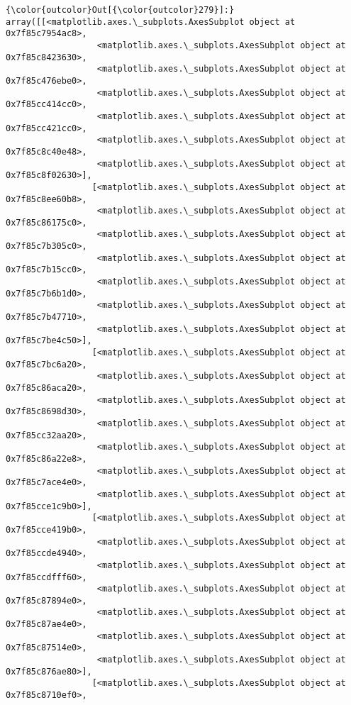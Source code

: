 \documentclass[11pt]{article}
\begin{document}
\begin{Verbatim}[commandchars=\\\{\}]
{\color{outcolor}Out[{\color{outcolor}279}]:} array([[<matplotlib.axes.\_subplots.AxesSubplot object at 0x7f85c7954ac8>,
                  <matplotlib.axes.\_subplots.AxesSubplot object at 0x7f85c8423630>,
                  <matplotlib.axes.\_subplots.AxesSubplot object at 0x7f85c476ebe0>,
                  <matplotlib.axes.\_subplots.AxesSubplot object at 0x7f85cc414cc0>,
                  <matplotlib.axes.\_subplots.AxesSubplot object at 0x7f85cc421cc0>,
                  <matplotlib.axes.\_subplots.AxesSubplot object at 0x7f85c8c40e48>,
                  <matplotlib.axes.\_subplots.AxesSubplot object at 0x7f85c8f02630>],
                 [<matplotlib.axes.\_subplots.AxesSubplot object at 0x7f85c8ee60b8>,
                  <matplotlib.axes.\_subplots.AxesSubplot object at 0x7f85c86175c0>,
                  <matplotlib.axes.\_subplots.AxesSubplot object at 0x7f85c7b305c0>,
                  <matplotlib.axes.\_subplots.AxesSubplot object at 0x7f85c7b15cc0>,
                  <matplotlib.axes.\_subplots.AxesSubplot object at 0x7f85c7b6b1d0>,
                  <matplotlib.axes.\_subplots.AxesSubplot object at 0x7f85c7b47710>,
                  <matplotlib.axes.\_subplots.AxesSubplot object at 0x7f85c7be4c50>],
                 [<matplotlib.axes.\_subplots.AxesSubplot object at 0x7f85c7bc6a20>,
                  <matplotlib.axes.\_subplots.AxesSubplot object at 0x7f85c86aca20>,
                  <matplotlib.axes.\_subplots.AxesSubplot object at 0x7f85c8698d30>,
                  <matplotlib.axes.\_subplots.AxesSubplot object at 0x7f85cc32aa20>,
                  <matplotlib.axes.\_subplots.AxesSubplot object at 0x7f85c86a22e8>,
                  <matplotlib.axes.\_subplots.AxesSubplot object at 0x7f85c7ace4e0>,
                  <matplotlib.axes.\_subplots.AxesSubplot object at 0x7f85cce1c9b0>],
                 [<matplotlib.axes.\_subplots.AxesSubplot object at 0x7f85cce419b0>,
                  <matplotlib.axes.\_subplots.AxesSubplot object at 0x7f85ccde4940>,
                  <matplotlib.axes.\_subplots.AxesSubplot object at 0x7f85ccdfff60>,
                  <matplotlib.axes.\_subplots.AxesSubplot object at 0x7f85c87894e0>,
                  <matplotlib.axes.\_subplots.AxesSubplot object at 0x7f85c87ae4e0>,
                  <matplotlib.axes.\_subplots.AxesSubplot object at 0x7f85c87514e0>,
                  <matplotlib.axes.\_subplots.AxesSubplot object at 0x7f85c876ae80>],
                 [<matplotlib.axes.\_subplots.AxesSubplot object at 0x7f85c8710ef0>,

\end{Verbatim}
\end{document}
